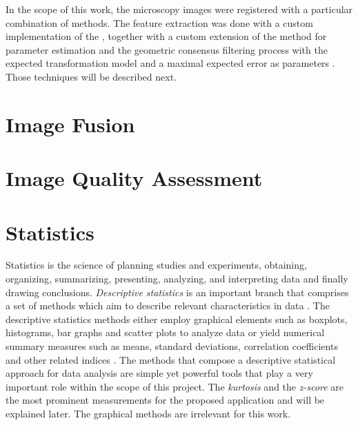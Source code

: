 In the scope of this work, the microscopy images were registered with a particular combination of methods. The feature extraction was done with a custom implementation of the , together with a custom extension of the  method for parameter estimation and the geometric consensus filtering process with the expected transformation model and a maximal expected error as parameters \cite{saalfeld2019computational}. Those techniques will be described next.


\section{Image Fusion}


\section{Image Quality Assessment}


\section{Statistics}

Statistics is the science of planning studies and experiments, obtaining, organizing, summarizing, presenting, analyzing, and interpreting data and finally drawing conclusions. \emph{Descriptive statistics} is an important branch that comprises a set of methods which aim to describe relevant characteristics in data \cite{triola2017elementary}. The descriptive statistics methods either employ graphical elements such as boxplots, histograms, bar graphs and scatter plots to analyze data or yield numerical summary measures such as means, standard deviations, correlation coefficients and other related indices \cite{devore2011probability}. The methods that compose a descriptive statistical approach for data analysis are simple yet powerful tools that play a very important role within the scope of this project. The \emph{kurtosis} and the \emph{z-score} are the most prominent measurements for the proposed application and will be explained later. The graphical methods are irrelevant for this work.

